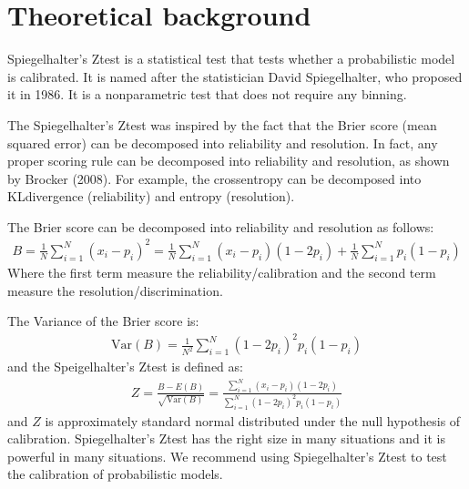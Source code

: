 \documentclass[letterpaper,10pt,english]{sphinxmanual}
\begin{document}
\section{Theoretical background}
\label{\detokenize{notebooks/spiegelhalter_z:Theoretical-background}}
\sphinxAtStartPar
Spiegelhalter’s Z\sphinxhyphen{}test is a statistical test that tests whether a probabilistic model is calibrated. It is named after the statistician David Spiegelhalter, who proposed it in 1986. It is a non\sphinxhyphen{}parametric test that does not require any binning.

\sphinxAtStartPar
The Spiegelhalter’s Z\sphinxhyphen{}test was inspired by the fact that the Brier score (mean squared error) can be decomposed into reliability and resolution. In fact, any proper scoring rule can be decomposed into reliability and resolution, as shown by Brocker (2008). For example, the cross\sphinxhyphen{}entropy can be decomposed into KL\sphinxhyphen{}divergence (reliability) and entropy (resolution).

\sphinxAtStartPar
The Brier score can be decomposed into reliability and resolution as follows:
\begin{equation*}
\begin{split}B = \frac{1}{N} \sum_{i=1}^N (x_i - p_i)^2 = \frac{1}{N} \sum_{i=1}^N (x_i - p_i)(1-2p_i) + \frac{1}{N} \sum_{i=1}^N p_i(1-p_i)\end{split}
\end{equation*}
\sphinxAtStartPar
Where the first term measure the reliability/calibration and the second term measure the resolution/discrimination.

\sphinxAtStartPar
The Variance of the Brier score is:
\begin{equation*}
\begin{split}\text{Var}(B) = \frac{1}{N^2} \sum_{i=1}^N (1-2p_i)^2 p_i (1-p_i)\end{split}
\end{equation*}
\sphinxAtStartPar
and the Speigelhalter’s Z\sphinxhyphen{}test is defined as:
\begin{equation*}
\begin{split}Z = \frac{B - E(B)}{\sqrt{\text{Var}(B)}} = \frac{ \sum_{i=1}^N (x_i - p_i)(1-2p_i)}{\sum_{i=1}^N (1-2p_i)^2 p_i (1-p_i)}\end{split}
\end{equation*}
\sphinxAtStartPar
and \(Z\) is approximately standard normal distributed under the null hypothesis of calibration. Spiegelhalter’s Z\sphinxhyphen{}test has the right size in many situations and it is powerful in many situations. We recommend using Spiegelhalter’s Z\sphinxhyphen{}test to test the calibration of probabilistic models.
\end{document}
